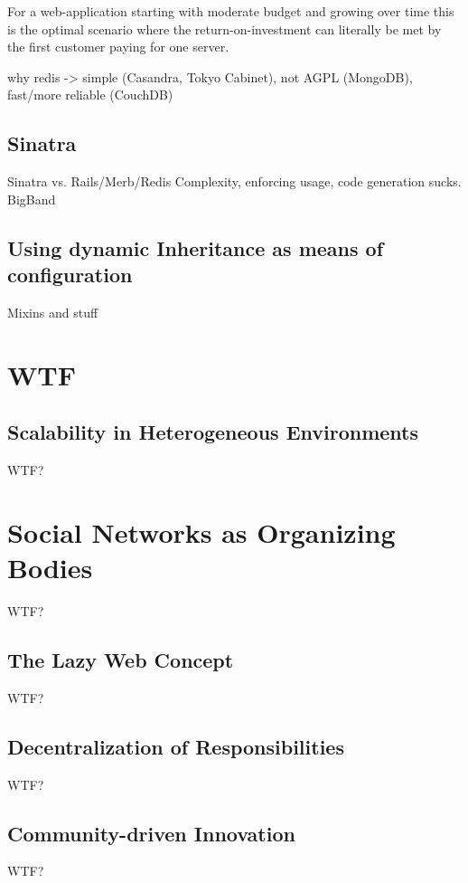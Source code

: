 \documentclass{llncs}
\begin{document}
For a web-application starting with
moderate budget and growing over time this is the optimal scenario where the 
return-on-investment can literally be met by the first customer paying for one 
server.



why redis -> simple (Casandra, Tokyo Cabinet), not AGPL (MongoDB), fast/more reliable (CouchDB)

\subsection{Sinatra}
Sinatra vs. Rails/Merb/Redis
Complexity, enforcing usage, code generation sucks.
BigBand

\subsection{Using dynamic Inheritance as means of configuration}
Mixins and stuff

\section{WTF}

\subsection{Scalability in Heterogeneous Environments}
WTF?

\section{Social Networks as Organizing Bodies}
WTF?

\subsection{The Lazy Web Concept}
WTF?

\subsection{Decentralization of Responsibilities}
WTF?

\subsection{Community-driven Innovation}
WTF?
\end{document}
